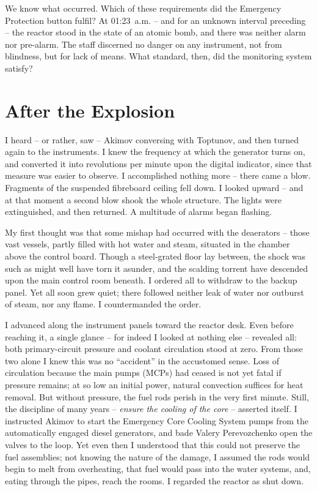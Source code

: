\documentclass[openright]{bookest}
\begin{document}
We know what occurred. Which of these requirements did the Emergency Protection button fulfil? At 01:23~a.m. -- and for an unknown interval preceding -- the reactor stood in the state of an atomic bomb, and there was neither alarm nor pre-alarm. The staff discerned no danger on any instrument, not from blindness, but for lack of means. What standard, then, did the monitoring system satisfy?

\chapter{After the Explosion}

I heard -- or rather, saw -- Akimov conversing with Toptunov, and then turned again to the instruments. I knew the frequency at which the generator turns on, and converted it into revolutions per minute upon the digital indicator, since that measure was easier to observe. I accomplished nothing more -- there came a blow. Fragments of the suspended fibreboard ceiling fell down. I looked upward -- and at that moment a second blow shook the whole structure. The lights were extinguished, and then returned. A multitude of alarms began flashing.

My first thought was that some mishap had occurred with the deaerators -- those vast vessels, partly filled with hot water and steam, situated in the chamber above the control board. Though a steel-grated floor lay between, the shock was such as might well have torn it asunder, and the scalding torrent have descended upon the main control room beneath. I ordered all to withdraw to the backup panel. Yet all soon grew quiet; there followed neither leak of water nor outburst of steam, nor any flame. I countermanded the order.

I advanced along the instrument panels toward the reactor desk. Even before reaching it, a single glance -- for indeed I looked at nothing else -- revealed all: both primary-circuit pressure and coolant circulation stood at zero. From those two alone I knew this was no ``accident'' in the accustomed sense. Loss of circulation because the main pumps (MCPs) had ceased is not yet fatal if pressure remains; at so low an initial power, natural convection suffices for heat removal. But without pressure, the fuel rods perish in the very first minute. Still, the discipline of many years -- \textit{ensure the cooling of the core} -- asserted itself. I instructed Akimov to start the Emergency Core Cooling System pumps from the automatically engaged diesel generators, and bade Valery Perevozchenko open the valves to the loop. Yet even then I understood that this could not preserve the fuel assemblies; not knowing the nature of the damage, I assumed the rods would begin to melt from overheating, that fuel would pass into the water systems, and, eating through the pipes, reach the rooms. I regarded the reactor as shut down.
\end{document}

